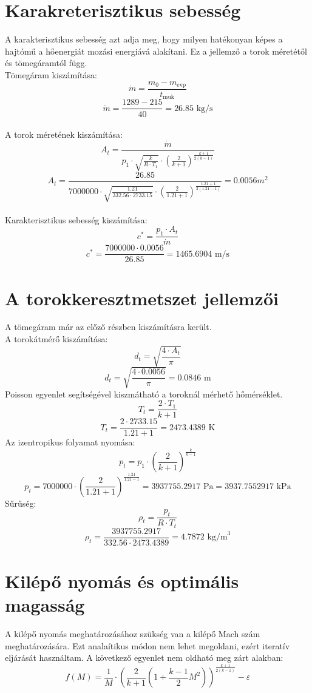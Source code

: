 \documentclass[a4paper,12pt]{article}
\begin{document}
\section{Karakreterisztikus sebesség}
A karakterisztikus sebesség azt adja meg, hogy milyen hatékonyan képes a hajtómű
a hőenergiát mozási energiává alakítani. Ez a jellemző a torok méretétől és tömegáramtól függ.
\\Tömegáram kiszámítása:
\[
\dot{m} = \frac{m_0 - m_{\text{evp}}}{t_{\text{muk}}}
\]
\[
\dot{m} = \frac{1289 - 215}{40} = 26.85 \text{ kg/s}
\]
\\A torok méretének kiszámítása:
\[
A_t = \frac{\dot{m}}{p_1 \cdot \sqrt{\frac{k}{R \cdot T_1}} \cdot \left( \frac{2}{k+1} \right)^{\frac{k+1}{2(k-1)}}}
\]
\[
A_t = \frac{26.85}{7000000 \cdot \sqrt{\frac{1.21}{332.56 \cdot 2733.15}} \cdot \left( \frac{2}{1.21+1} \right)^{\frac{1.21+1}{2(1.21-1)}}} = 0.0056 m^2
\]
\\Karakterisztikus sebesség kiszámítása:
\[
c^* = \frac{p_1 \cdot A_t}{\dot{m}}
\]
\[
c^* = \frac{7000000 \cdot 0.0056}{26.85} = 1465.6904 \text{ m/s}
\]

\section{A torokkeresztmetszet jellemzői}
A tömegáram már az előző részben kiszámításra került.\\
A torokátmérő kiszámítása:
\[
d_t = \sqrt{\frac{4 \cdot A_t}{\pi}}
\]
\[
d_t = \sqrt{\frac{4 \cdot 0.0056}{\pi}} = 0.0846 \text{ m}
\]
Poisson egyenlet segítségével kiszmátható a toroknál mérhető hőmérséklet.
\[
T_t = \frac{2 \cdot T_1}{k + 1}
\]
\[
T_t = \frac{2 \cdot 2733.15}{1.21 + 1} = 2473.4389 \text{ K}
\]
Az izentropikus folyamat nyomása:
\[
p_t = p_1 \cdot \left( \frac{2}{k + 1} \right)^{\frac{k}{k - 1}}
\]
\[
p_t = 7000000 \cdot \left( \frac{2}{1.21 + 1} \right)^{\frac{1.21}{1.21 - 1}} = 3937755.2917 \text{ Pa} = 3937.7552917 \text{ kPa}
\]
Sűrűség:
\[
\rho_t = \frac{p_t}{R \cdot T_t}
\]
\[
\rho_t = \frac{3937755.2917}{332.56 \cdot 2473.4389} = 4.7872 \text{ kg/m}^3
\]

\section{Kilépő nyomás és optimális magasság}
A kilépő nyomás meghatározásához szükség van a kilépő Mach szám meghatározására. Ezt analaítikus módon nem lehet megoldani, ezért iteratív eljárását használtam. A következő egyenlet nem oldható meg zárt alakban:
\[
f(M) = \frac{1}{M} \cdot \left( \frac{2}{k+1} \left(1 + \frac{k-1}{2}M^2 \right) \right)^{\frac{k+1}{2(k-1)}} - \varepsilon
\]
\end{document}

